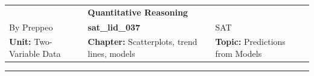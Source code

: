 \documentclass[11pt,paper=a4,answers]{exam}
\begin{document}
\begin{center}
    \centering
    \renewcommand{\arraystretch}{1.5}
    \begin{tabularx}{\textwidth}{YYY}
    & \normalsize\bf{{\Large{{Quantitative Reasoning}}}} & \\
    By Preppeo & \normalsize\bf{{sat\_lid\_037}} & SAT\\
    \normalsize{{\textbf{{Unit:}} Two-Variable Data}} & \normalsize{{\textbf{{Chapter:}} Scatterplots, trend lines, models}} & \normalsize{{\textbf{{Topic:}} Predictions from Models}} \\
    \end{tabularx}
\end{center}
\par\noindent\rule{\textwidth}{1pt}
\end{document}
